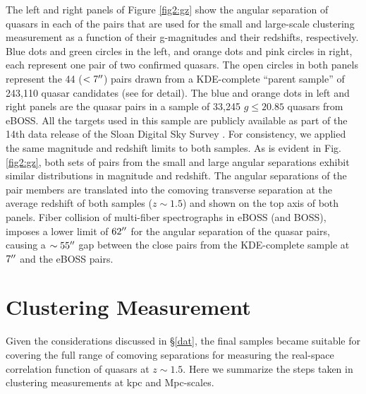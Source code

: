 \documentclass[useAMS,usenatbib]{mn2e}
\begin{document}
The left and right panels of Figure \ref{fig2:gz} show the angular separation of quasars in each of the pairs that are 
used for the small and large-scale clustering measurement as a function of their 
g-magnitudes and their redshifts, respectively. Blue dots and green circles in 
the left, and orange dots and pink circles in right, each represent one pair of 
two confirmed quasars. The open circles in both panels represent the 44 ($< 7 
\arcsec$) pairs drawn from a KDE-complete ``parent sample'' of  243{,}110 quasar 
candidates (see \citet{ef17} for detail). The blue and orange dots in left and 
right panels are the quasar pairs in a sample of 33{,}245 $g\le 20.85$ quasars 
from eBOSS. All the targets used in this sample are publicly available as part 
of the 14th data release of the Sloan Digital Sky Survey \citep[DR14; ][]{dr14}. 
For consistency, we applied the same magnitude and redshift limits to both 
samples. 
As is evident in Fig. \ref{fig2:gz}, both sets of pairs from the small and large angular separations 
exhibit similar distributions in magnitude and redshift. 
The angular separations of the pair members are translated into the 
comoving transverse separation at the average redshift of both samples ($z\sim 
1.5$) and shown on the top axis of both panels. Fiber collision of multi-fiber 
spectrographs in eBOSS (and BOSS), imposes a lower limit of $62\arcsec$ for the 
angular separation of the quasar pairs, causing a $\sim 55\arcsec$ gap between 
the close pairs from the KDE-complete sample at $7\arcsec$ and the eBOSS 
pairs.


\section{Clustering Measurement}\label{cls}
Given the considerations discussed in \S\ref{dat}, the final samples became 
suitable for covering the full range of comoving separations for measuring the 
real-space correlation function of quasars at $z\sim 1.5$.  Here we summarize 
the steps taken in clustering measurements at kpc and Mpc-scales. 
\end{document}
